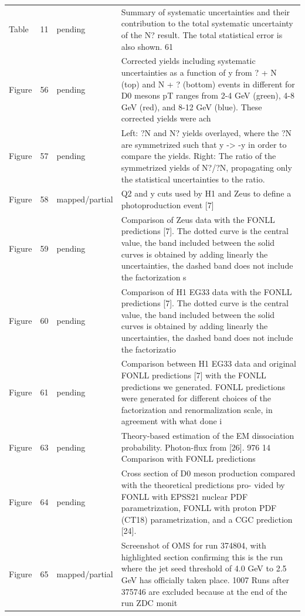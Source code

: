 \documentclass[11pt]{article}
\begin{document}
\begin{longtable}{lll p{}}
Table & 11 & pending & Summary of systematic uncertainties and their contribution to the total systematic uncertainty of the N? result. The total statistical error is also shown. 61 \\
Figure & 56 & pending & Corrected yields including systematic uncertainties as a function of y from ? + N (top) and N + ? (bottom) events in different for D0 mesons pT ranges from 2-4 GeV (green), 4-8 GeV (red), and 8-12 GeV (blue). These corrected yields were ach \\
Figure & 57 & pending & Left: ?N and N? yields overlayed, where the ?N are symmetrized such that y -> -y in order to compare the yields. Right: The ratio of the symmetrized yields of N?/?N, propagating only the statistical uncertainties to the ratio. \\
Figure & 58 & mapped/partial & Q2 and y cuts used by H1 and Zeus to define a photoproduction event [7] \\
Figure & 59 & pending & Comparison of Zeus data with the FONLL predictions [7]. The dotted curve is the central value, the band included between the solid curves is obtained by adding linearly the uncertainties, the dashed band does not include the factorization s \\
Figure & 60 & pending & Comparison of H1 EG33 data with the FONLL predictions [7]. The dotted curve is the central value, the band included between the solid curves is obtained by adding linearly the uncertainties, the dashed band does not include the factorizatio \\
Figure & 61 & pending & Comparison between H1 EG33 data and original FONLL predictions [7] with the FONLL predictions we generated. FONLL predictions were generated for different choices of the factorization and renormalization scale, in agreement with what done i \\
Figure & 63 & pending & Theory-based estimation of the EM dissociation probability. Photon-flux from [26]. 976 14 Comparison with FONLL predictions \\
Figure & 64 & pending & Cross section of D0 meson production compared with the theoretical predictions pro- vided by FONLL with EPSS21 nuclear PDF parametrization, FONLL with proton PDF (CT18) parametrization, and a CGC prediction [24]. \\
Figure & 65 & mapped/partial & Screenshot of OMS for run 374804, with highlighted section confirming this is the run where the jet seed threshold of 4.0 GeV to 2.5 GeV has officially taken place. 1007 Runs after 375746 are excluded because at the end of the run ZDC monit \\

\end{longtable}
\end{document}
